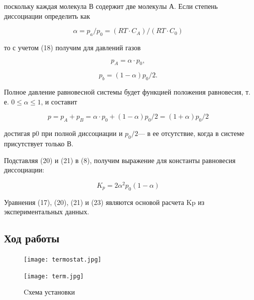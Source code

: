 \documentclass[a4paper,12pt]{article} %
\begin{document}
поскольку каждая молекула В содержит две молекулы А.
Если степень диссоциации определить как

\begin{equation}
 \alpha = p_a/p_0 = (RT \cdot C_A)/(RT \cdot C_0)	
\end{equation}

то с учетом (18) получим для давлений газов

\begin{equation}
 p_A = \alpha \cdot p_0,
\end{equation}


\begin{equation}
p_b = (1-\alpha)p_0/2.
\end{equation}

Полное давление равновесной системы будет функцией положения равновесия, т. е. \(0 \leqslant \alpha \leqslant 1\), и составит

\begin{equation}
p = p_A + p_B = \alpha\cdot p_0 + (1- \alpha)p_0/2 = (1+\alpha)p_0/2
\end{equation}

достигая р0 при полной диссоциации и \(p_0/2\)— в ее отсутствие, когда в системе присутствует только В.

Подставляя (20) и (21) в (8), получим выражение для константы равновесия диссоциации:

\begin{equation}
K_p = 2 \alpha^2 p_0(1- \alpha)
\end{equation}

Уравнения (17), (20), (21) и (23) являются основой расчета Kp из экспериментальных данных.



\subsection*{Ход работы}

\begin{figure}[h]
	\begin{center}
		\begin{minipage}{0.45 \linewidth}
			\texttt{[image: termostat.jpg]}
		\end{minipage}
		\qquad
		\begin{minipage}{0.45 \linewidth}
			\texttt{[image: term.jpg]}
		\end{minipage}
	\end{center}
	\caption{Cхема установки}
\end{figure}
\end{document}
